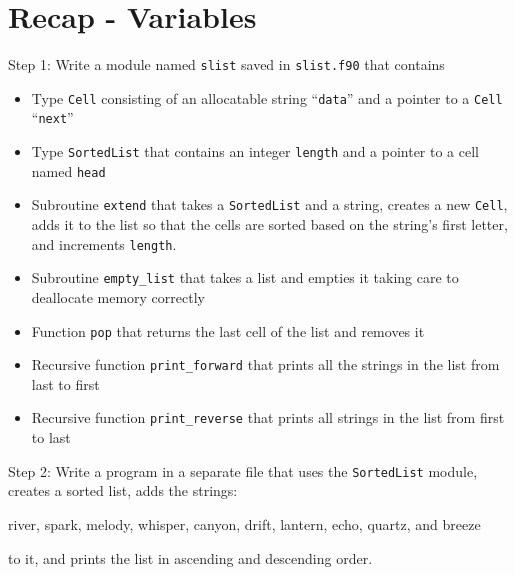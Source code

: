
\subtitle{Lecture 4: Linked list exercise}



\begin{frame}
  \titlepage
\end{frame}

\section{Recap - Variables}

\begin{frame}

Step 1: Write a module named \texttt{slist} saved in \texttt{slist.f90} that contains
\small
\begin{itemize}
    \item Type \texttt{Cell} consisting of an allocatable string ``\texttt{data}'' and a pointer to a \texttt{Cell} ``\texttt{next}''
    \item Type \texttt{SortedList} that contains an integer \texttt{length} and a pointer to a cell named \texttt{head}
    \item Subroutine \texttt{extend} that takes a \texttt{SortedList} and a string, creates a new \texttt{Cell}, adds it to the list so that the cells are sorted based on the string's first letter, and increments \texttt{length}.
    \item Subroutine \texttt{empty\_list} that takes a list and empties it taking care to deallocate memory correctly
    \item Function \texttt{pop} that returns the last cell of the list and removes it
    \item Recursive function \texttt{print\_forward} that prints all the strings in the list from last to first
    \item Recursive function \texttt{print\_reverse} that prints all strings in the list from first to last
\end{itemize}
\end{frame}

\begin{frame}

Step 2: Write a program in a separate file that uses the \texttt{SortedList} module, creates a sorted list, adds the strings:

\vspace{2mm}
river, spark, melody, whisper, canyon, drift, lantern, echo, quartz, and breeze

\vspace{2mm}
to it, and prints the list in ascending and descending order.


\end{frame}


